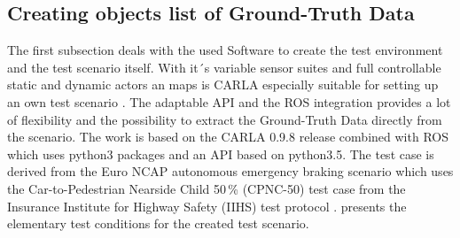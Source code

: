 
\subsection{Creating objects list of Ground-Truth Data}
The first subsection deals with the used Software to create the test environment and the test scenario itself. With it´s variable sensor suites and full controllable static and dynamic actors an maps is CARLA especially suitable for setting up an own test scenario \cite{Dosovitskiy17}. The adaptable \ac{API} and the \ac{ROS} integration provides a lot of flexibility and the possibility to extract the Ground-Truth Data directly from the scenario. The work is based on the CARLA 0.9.8 release combined with \ac{ROS} which uses python3 packages and an \ac{API} based on python3.5. The test case is derived from the Euro NCAP autonomous emergency braking scenario which uses the Car-to-Pedestrian Nearside Child 50\,\% (CPNC-50) test case from the Insurance Institute for Highway Safety (IIHS) test protocol \cite{NCAP, Protocoll}.  presents the elementary test conditions for the created test scenario. %


